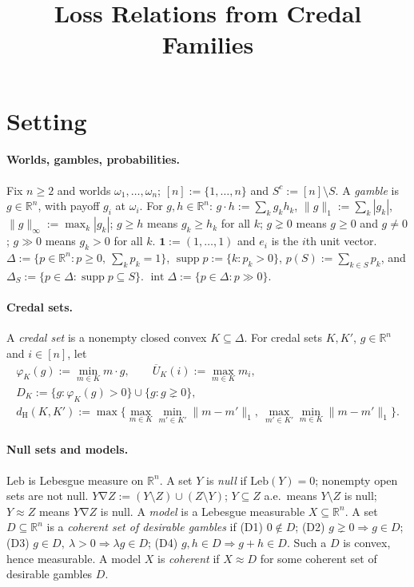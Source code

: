 \documentclass[11pt]{article}
\title{Loss Relations from Credal Families}
\author{}
\date{}
\theoremstyle{definition}
\newcommand{\R}{\mathbb R}
\newcommand{\one}{\mathbf 1}
\newcommand{\supp}{\operatorname{supp}}
\newcommand{\dH}{d_{\mathrm H}}
\newcommand{\Ub}{\overline U}
\newcommand{\sd}{\mathbin{\nabla}}
\newcommand{\Leb}{\mathrm{Leb}}
\begin{document}
\maketitle

\section{Setting}\label{sec:setting}

\paragraph{Worlds, gambles, probabilities.}
Fix $n\ge2$ and worlds $\omega_1,\dots,\omega_n$; $[n]:=\{1,\dots,n\}$ and $S^c:=[n]\setminus S$. A \emph{gamble} is $g\in\R^n$, with payoff $g_i$ at $\omega_i$. For $g,h\in\R^n$: $g\cdot h:=\sum_kg_kh_k$, $\|g\|_1:=\sum_k|g_k|$, $\|g\|_\infty:=\max_k|g_k|$; $g\ge h$ means $g_k\ge h_k$ for all $k$; $g\gneq0$ means $g\ge0$ and $g\ne0$; $g\gg0$ means $g_k>0$ for all $k$. $\one:=(1,\dots,1)$ and $e_i$ is the $i$th unit vector. $\Delta:=\{p\in\R^n:p\ge0,\ \sum_kp_k=1\}$, $\supp p:=\{k:p_k>0\}$, $p(S):=\sum_{k\in S}p_k$, and $\Delta_S:=\{p\in\Delta:\supp p\subseteq S\}$. $\operatorname{int}\Delta:=\{p\in\Delta:p\gg0\}$.

\paragraph{Credal sets.}
A \emph{credal set} is a nonempty closed convex $K\subseteq\Delta$. For credal sets $K,K'$, $g\in\R^n$ and $i\in[n]$, let
\begin{gather*}
\varphi_K(g):=\min_{m\in K}m\cdot g,\qquad \Ub_K(i):=\max_{m\in K}m_i,\\
D_K:=\{g:\varphi_K(g)>0\}\cup\{g:g\gneq0\},\\
\dH(K,K'):=\max\Big\{\max_{m\in K}\min_{m'\in K'}\|m-m'\|_1,\ \max_{m'\in K'}\min_{m\in K}\|m-m'\|_1\Big\}.
\end{gather*}

\paragraph{Null sets and models.}
$\Leb$ is Lebesgue measure on $\R^n$. A set $Y$ is \emph{null} if $\Leb(Y)=0$; nonempty open sets are not null. $Y\sd Z:=(Y\setminus Z)\cup(Z\setminus Y)$; $Y\subseteq Z$ a.e.\ means $Y\setminus Z$ is null; $Y\approx Z$ means $Y\sd Z$ is null. A \emph{model} is a Lebesgue measurable $X\subseteq\R^n$. A set $D\subseteq\R^n$ is a \emph{coherent set of desirable gambles} if (D1) $0\notin D$; (D2) $g\gneq0\Rightarrow g\in D$; (D3) $g\in D,\ \lambda>0\Rightarrow\lambda g\in D$; (D4) $g,h\in D\Rightarrow g+h\in D$. Such a $D$ is convex, hence measurable. A model $X$ is \emph{coherent} if $X\approx D$ for some coherent set of desirable gambles $D$.
\end{document}
